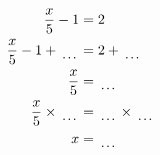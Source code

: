 \documentclass[12pt]{article}
\begin{document}
\begin{multicols}{2}
\begin{minipage}[t]{0.45\textwidth}
    \raggedright %
    \begin{align*} %
        \frac{x}{5} - 1 &= 2\\
        \frac{x}{5} - 1 + \dotuline{\hspace{5mm}} &= 2 + \dotuline{\hspace{5mm}}\\
        \frac{x}{5} &= \dotuline{\hspace{5mm}}\\
        \frac{x}{5} \times\dotuline{\hspace{5mm}} &= \dotuline{\hspace{5mm}} \times\dotuline{\hspace{5mm}}\\
        x &= \dotuline{\hspace{5mm}}\\
    \end{align*}
\end{minipage}\newpage

\end{multicols}
\end{document}
